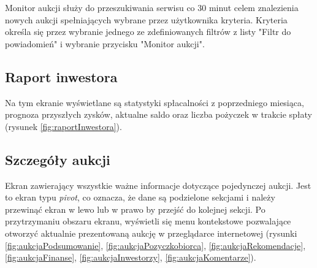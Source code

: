 \documentclass[a4paper,twoside,titlepage,openright]{book}
\begin{document}
Monitor aukcji służy do przeszukiwania serwisu co 30 minut celem znalezienia nowych aukcji spełniających wybrane przez użytkownika kryteria. Kryteria określa się przez wybranie jednego ze zdefiniowanych filtrów z listy "Filtr do powiadomień" i wybranie przycisku "Monitor aukcji".

\subsection{Raport inwestora}
Na tym ekranie wyświetlane są statystyki spłacalności z poprzedniego miesiąca, prognoza przyszłych zysków, aktualne saldo oraz liczba pożyczek w trakcie spłaty (rysunek \ref{fig:raportInwestora}).

\subsection{Szczegóły aukcji}
Ekran zawierający wszystkie ważne informacje dotyczące pojedynczej aukcji. Jest to ekran typu \textit{pivot}, co oznacza, że dane są podzielone sekcjami i należy przewinąć ekran w lewo lub w prawo by przejść do kolejnej sekcji. Po przytrzymaniu obszaru ekranu, wyświetli się menu kontekstowe pozwalające otworzyć aktualnie prezentowaną aukcję w przeglądarce internetowej (rysunki \ref{fig:aukcjaPodsumowanie}, \ref{fig:aukcjaPozyczkobiorca}, \ref{fig:aukcjaRekomendacje}, \ref{fig:aukcjaFinanse}, \ref{fig:aukcjaInwestorzy}, \ref{fig:aukcjaKomentarze}).
\end{document}
